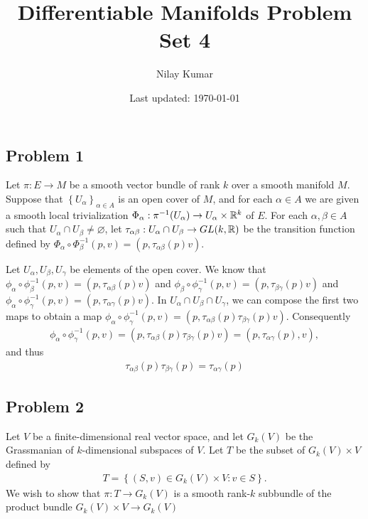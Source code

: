 \documentclass{../../mathnotes}
\title{Differentiable Manifolds Problem Set 4}
\author{Nilay Kumar}
\date{Last updated: \today}
\begin{document}
\maketitle

\subsection*{Problem 1}

Let $\pi: E\to M$ be a smooth vector bundle of rank $k$ over a smooth manifold $M$. Suppose that $\left\{ U_\alpha \right\}_{\alpha\in A}$
is an open cover of $M$, and for each $\alpha\in A$ we are given a smooth local trivialization $\Phi_\alpha:\pi^{-1}(U_\alpha)\to U_\alpha\times\mathbb{R}^k$
of $E$. For each $\alpha,\beta\in A$ such that $U_\alpha\cap U_\beta\neq\varnothing$, let $\tau_{\alpha\beta}:U_\alpha\cap U_\beta\to GL(k,\mathbb{R})$ be
the transition function defined by $\Phi_\alpha\circ\Phi_\beta^{-1}(p,v)=(p,\tau_{\alpha\beta}(p)v)$.

Let $U_\alpha,U_\beta,U_\gamma$ be elements of the open cover. We know that $\phi_\alpha\circ\phi^{-1}_\beta(p,v)=(p,\tau_{\alpha\beta}(p)v)$
and $\phi_\beta\circ\phi^{-1}_\gamma(p,v)=(p,\tau_{\beta\gamma}(p)v)$ and $\phi_\alpha\circ\phi^{-1}_\gamma(p,v)=(p,\tau_{\alpha\gamma}(p)v)$.
In $U_\alpha\cap U_\beta\cap U_\gamma$, we can compose the first two maps to obtain a map $\phi_\alpha\circ\phi^{-1}_\gamma(p,v)=(p,\tau_{\alpha\beta}(p)\tau_{\beta\gamma}(p)v)$.
Consequently
\begin{align*}
    \phi_\alpha\circ\phi^{-1}_\gamma(p,v)=(p,\tau_{\alpha\beta}(p)\tau_{\beta\gamma}(p)v)=(p,\tau_{\alpha\gamma}(p),v),
\end{align*}
and thus
\begin{align*}
    \tau_{\alpha\beta}(p)\tau_{\beta\gamma}(p)=\tau_{\alpha\gamma}(p)
\end{align*}

\subsection*{Problem 2}

Let $V$ be a finite-dimensional real vector space, and let $G_k(V)$ be the Grassmanian of $k$-dimensional subspaces of $V$. Let $T$
be the subset of $G_k(V)\times V$ defined by
\begin{align*}
    T=\left\{ (S,v)\in G_k(V)\times V:v\in S \right\}.
\end{align*}
We wish to show that $\pi:T\to G_k(V)$ is a smooth rank-$k$ subbundle of the product bundle $G_k(V)\times V\to G_k(V)$
\end{document}
